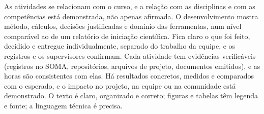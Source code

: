 
  {As atividades se relacionam com o curso, e a relação com as disciplinas e com as competências está demonstrada, não apenas afirmada.}
  {O desenvolvimento mostra método, cálculos, decisões justificadas e domínio das ferramentas, num nível comparável ao de um relatório de iniciação científica.}
  {Fica claro o que foi feito, decidido e entregue individualmente, separado do trabalho da equipe, e os registros e os supervisores confirmam.}
  {Cada atividade tem evidências verificáveis (registros no SOMA, repositórios, arquivos de projeto, documentos emitidos), e as horas são consistentes com elas.}
  {Há resultados concretos, medidos e comparados com o esperado, e o impacto no projeto, na equipe ou na comunidade está demonstrado.}
  {O texto é claro, organizado e correto; figuras e tabelas têm legenda e fonte; a linguagem técnica é precisa.}

